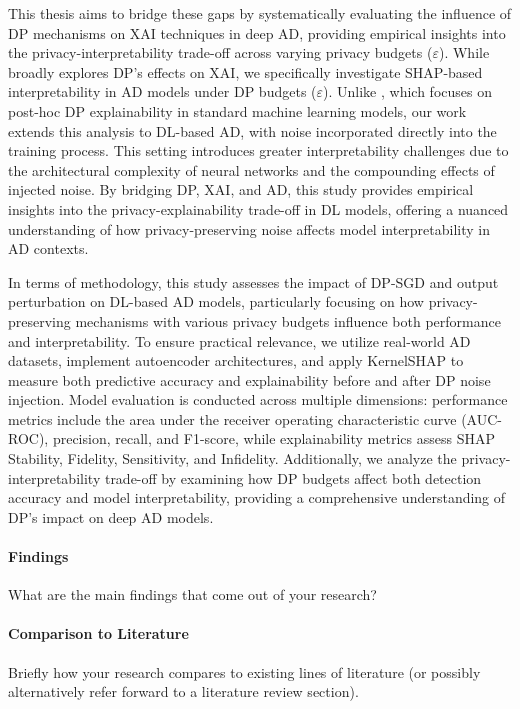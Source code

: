 This thesis aims to bridge these gaps by systematically evaluating the influence of DP mechanisms on XAI techniques in deep AD, providing empirical insights into the privacy-interpretability trade-off across varying privacy budgets ($\varepsilon$). While \cite{saifullah2022privacy} broadly explores DP’s effects on XAI, we specifically investigate SHAP-based interpretability in AD models under DP budgets ($\varepsilon$). Unlike \cite{ezzeddine2024differential}, which focuses on post-hoc DP explainability in standard machine learning models, our work extends this analysis to DL-based AD, with noise incorporated directly into the training process. This setting introduces greater interpretability challenges due to the architectural complexity of neural networks and the compounding effects of injected noise. By bridging DP, XAI, and AD, this study provides empirical insights into the privacy-explainability trade-off in DL models, offering a nuanced understanding of how privacy-preserving noise affects model interpretability in AD contexts.

In terms of methodology, this study assesses the impact of DP-SGD and output perturbation on DL-based AD models, particularly focusing on how privacy-preserving mechanisms with various privacy budgets influence both performance and interpretability. To ensure practical relevance, we utilize real-world AD datasets, implement autoencoder architectures, and apply KernelSHAP to measure both predictive accuracy and explainability before and after DP noise injection. Model evaluation is conducted across multiple dimensions: performance metrics include the area under the receiver operating characteristic curve (AUC-ROC), precision, recall, and F1-score, while explainability metrics assess SHAP Stability, Fidelity, Sensitivity, and Infidelity. Additionally, we analyze the privacy-interpretability trade-off by examining how DP budgets affect both detection accuracy and model interpretability, providing a comprehensive understanding of DP’s impact on deep AD models.

\paragraph{Findings} What are the main findings that come out of your research?

\paragraph{Comparison to Literature} Briefly how your research compares to existing lines of literature (or possibly alternatively refer forward to a literature review section).

